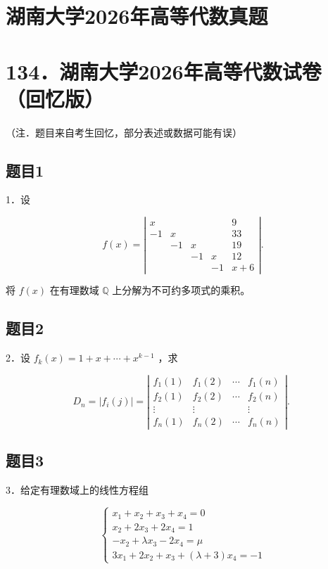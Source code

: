 \documentclass{article}
\begin{document}
\section*{湖南大学2026年高等代数真题}
\section*{134．湖南大学2026年高等代数试卷（回忆版）}
（注．题目来自考生回忆，部分表述或数据可能有误）

\subsection{题目1}
1．设

\[
f(x)=\left|\begin{array}{ccccc}
x & & & & 9 \\
-1 & x & & & 33 \\
& -1 & x & & 19 \\
& & -1 & x & 12 \\
& & & -1 & x+6
\end{array}\right| .
\]

将 \(f(x)\) 在有理数域 \(\mathbb{Q}\) 上分解为不可约多项式的乘积。

\subsection{题目2}
2．设 \(f_{k}(x)=1+x+\cdots+x^{k-1}\) ，求

\[
D_{n}=\left|f_{i}(j)\right|=\left|\begin{array}{cccc}
f_{1}(1) & f_{1}(2) & \cdots & f_{1}(n) \\
f_{2}(1) & f_{2}(2) & \cdots & f_{2}(n) \\
\vdots & \vdots & & \vdots \\
f_{n}(1) & f_{n}(2) & \cdots & f_{n}(n)
\end{array}\right| \text {. }
\]

\subsection{题目3}
3．给定有理数域上的线性方程组

\[
\left\{\begin{array}{l}
x_{1}+x_{2}+x_{3}+x_{4}=0 \\
x_{2}+2 x_{3}+2 x_{4}=1 \\
-x_{2}+\lambda x_{3}-2 x_{4}=\mu \\
3 x_{1}+2 x_{2}+x_{3}+(\lambda+3) x_{4}=-1
\end{array}\right.
\]
\end{document}
